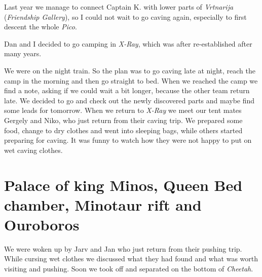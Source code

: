 
Last year we manage to connect Captain K. with lower parts of
\emph{Vrtnarija} (\emph{Friendship Gallery}), so I could not wait to go
caving again, especially to first descent the whole \emph{Pico}.

Dan and I decided to go camping in \emph{X-Ray}, which was after
re-established after many years.

We were on the night train. So the plan was to go caving late at night,
reach the camp in the morning and then go straight to bed. When we
reached the camp we find a note, asking if we could wait a bit longer,
because the other team return late. We decided to go and check out the
newly discovered parts and maybe find some leads for tomorrow. When we
return to \emph{X-Ray} we meet our tent mates Gergely and Niko, who just
return from their caving trip. We prepared some food, change to dry
clothes and went into sleeping bags, while others started preparing for
caving. It was funny to watch how they were not happy to put on wet
caving clothes.



\section{Palace of king Minos, Queen Bed chamber, Minotaur rift and
Ouroboros}

We were woken up by Jarv and Jan who just return from their pushing
trip. While cursing wet clothes we discussed what they had found and
what was worth visiting and pushing. Soon we took off and separated on
the bottom of \emph{Cheetah}.


